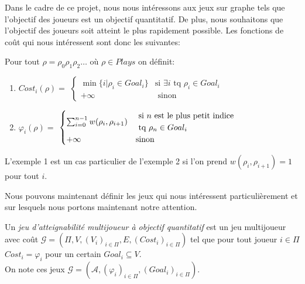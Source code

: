 \setlength{\overfullrule}{0pt}
  Dans le cadre de ce projet, nous nous intéressons aux jeux sur graphe tels que l'objectif des joueurs est un objectif quantitatif. De plus, nous souhaitons que l'objectif des joueurs soit atteint le plus rapidement possible. Les fonctions de coût qui nous intéressent sont donc les suivantes: \\
\begin{exemple}
		\label{ex:fonctionsCout}
	Pour tout  $\rho = \rho _{0} \rho _{1} \rho _{2} \ldots $ où $\rho \in Plays$ on définit:
	\begin{enumerate}
	\item $Cost_{i}(\rho) = $ $\begin{cases} 
									\min \{ i | \rho _{i} \in Goal_{i} \} & \text{si } \exists i \text{ tq } \rho _{i} \in Goal_{i} \\
									
									+\infty & \text{ sinon}
									\end{cases}$
	\item $\varphi _{i}(\rho) = $ $\begin{cases}
									 \multirow{2}{*}{$\sum_{i = 0}^{n-1}  w(\rho_{i},\rho_{i+1}) $} & \text{ si } n \text{ est le plus petit indice}\\ 
									
									& \text{ tq } \rho_{n}\in Goal_{i}\\
									+\infty & \text{sinon}
									\end{cases}$ \\
								
									
	\end{enumerate}
\end{exemple}
\setlength{\overfullrule}{10pt}
\begin{rem}
	L'exemple 1 est un cas particulier de l'exemple 2 si l'on prend $w(\rho_{i},\rho_{i+1}) = 1$ pour tout $i$.
\end{rem}


Nous pouvons maintenant définir les jeux qui nous intéressent particulièrement et sur lesquels nous portons maintenant notre attention.

\begin{defi}
	
	Un \textit{jeu d'atteignabilité multijoueur à objectif quantitatif} est un jeu multijoueur avec coût $\mathcal{G} = (\Pi ,V ,(V_{i})_{i \in \Pi} ,E ,(Cost_{i})_{i \in \Pi})$ tel que pour tout joueur $i \in \Pi$ $Cost_{i} = \varphi _{i}$ pour un certain $Goal _{i} \subseteq V$.\\
	On note ces jeux $\mathcal{G} = (\mathcal{A},(\varphi _{i})_{i\in \Pi},(Goal_{i})_{i \in \Pi})$.
\end{defi}
	




